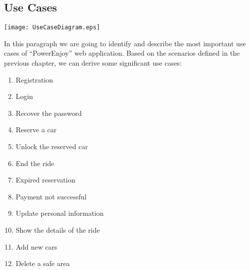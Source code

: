 \pagebreak
\subsection{Use Cases}
\centerline{
	\vspace{2cm}
		\texttt{[image: UseCaseDiagram.eps]}}



\pagebreak
In this paragraph we are going to identify and describe the most important use cases of ``PowerEnjoy'' web application.
Based on the scenarios defined in the previous chapter, we can derive some significant use cases:
\begin{enumerate}
	\item Registration
	\item Login
	\item Recover the password
	\item Reserve a car
	\item Unlock the reserved car
	\item End the ride
	\item Expired reservation
	\item Payment not successful
	\item Update personal information
	\item Show the details of the ride
	\item Add new cars
	\item Delete a safe area
\end{enumerate}

\newtoggle{exception}
\newenvironment{UseCase}[5]{
	\paragraph{Partecipating actors:} #1
	\paragraph{Entry condition:} #2
	\paragraph{Flow of events:}
	\begin{itemize} 
		#3 
	\end{itemize}
	\paragraph{Exit condition:} #4
	\iftoggle{exception}{
		\paragraph{Exceptions:}
		\begin{itemize}
			#5
		\end{itemize}
	}{
	}
}{}

